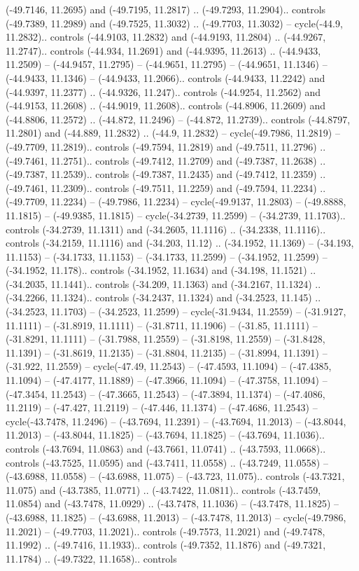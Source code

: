 \begin{scope}[shift={(2.5552, 9.9912)}]
\begin{scope}[shift={(48.1654, -14.8546)}]
(-49.7146, 11.2695) and (-49.7195, 11.2817) .. (-49.7293, 11.2904).. controls (-49.7389, 11.2989) and (-49.7525, 11.3032) .. (-49.7703, 11.3032) -- cycle(-44.9, 11.2832).. controls (-44.9103, 11.2832) and (-44.9193, 11.2804) .. (-44.9267, 11.2747).. controls (-44.934, 11.2691) and (-44.9395, 11.2613) .. (-44.9433, 11.2509) -- (-44.9457, 11.2795) -- (-44.9651, 11.2795) -- (-44.9651, 11.1346) -- (-44.9433, 11.1346) -- (-44.9433, 11.2066).. controls (-44.9433, 11.2242) and (-44.9397, 11.2377) .. (-44.9326, 11.247).. controls (-44.9254, 11.2562) and (-44.9153, 11.2608) .. (-44.9019, 11.2608).. controls (-44.8906, 11.2609) and (-44.8806, 11.2572) .. (-44.872, 11.2496) -- (-44.872, 11.2739).. controls (-44.8797, 11.2801) and (-44.889, 11.2832) .. (-44.9, 11.2832) -- cycle(-49.7986, 11.2819) -- (-49.7709, 11.2819).. controls (-49.7594, 11.2819) and (-49.7511, 11.2796) .. (-49.7461, 11.2751).. controls (-49.7412, 11.2709) and (-49.7387, 11.2638) .. (-49.7387, 11.2539).. controls (-49.7387, 11.2435) and (-49.7412, 11.2359) .. (-49.7461, 11.2309).. controls (-49.7511, 11.2259) and (-49.7594, 11.2234) .. (-49.7709, 11.2234) -- (-49.7986, 11.2234) -- cycle(-49.9137, 11.2803) -- (-49.8888, 11.1815) -- (-49.9385, 11.1815) -- cycle(-34.2739, 11.2599) -- (-34.2739, 11.1703).. controls (-34.2739, 11.1311) and (-34.2605, 11.1116) .. (-34.2338, 11.1116).. controls (-34.2159, 11.1116) and (-34.203, 11.12) .. (-34.1952, 11.1369) -- (-34.193, 11.1153) -- (-34.1733, 11.1153) -- (-34.1733, 11.2599) -- (-34.1952, 11.2599) -- (-34.1952, 11.178).. controls (-34.1952, 11.1634) and (-34.198, 11.1521) .. (-34.2035, 11.1441).. controls (-34.209, 11.1363) and (-34.2167, 11.1324) .. (-34.2266, 11.1324).. controls (-34.2437, 11.1324) and (-34.2523, 11.145) .. (-34.2523, 11.1703) -- (-34.2523, 11.2599) -- cycle(-31.9434, 11.2559) -- (-31.9127, 11.1111) -- (-31.8919, 11.1111) -- (-31.8711, 11.1906) -- (-31.85, 11.1111) -- (-31.8291, 11.1111) -- (-31.7988, 11.2559) -- (-31.8198, 11.2559) -- (-31.8428, 11.1391) -- (-31.8619, 11.2135) -- (-31.8804, 11.2135) -- (-31.8994, 11.1391) -- (-31.922, 11.2559) -- cycle(-47.49, 11.2543) -- (-47.4593, 11.1094) -- (-47.4385, 11.1094) -- (-47.4177, 11.1889) -- (-47.3966, 11.1094) -- (-47.3758, 11.1094) -- (-47.3454, 11.2543) -- (-47.3665, 11.2543) -- (-47.3894, 11.1374) -- (-47.4086, 11.2119) -- (-47.427, 11.2119) -- (-47.446, 11.1374) -- (-47.4686, 11.2543) -- cycle(-43.7478, 11.2496) -- (-43.7694, 11.2391) -- (-43.7694, 11.2013) -- (-43.8044, 11.2013) -- (-43.8044, 11.1825) -- (-43.7694, 11.1825) -- (-43.7694, 11.1036).. controls (-43.7694, 11.0863) and (-43.7661, 11.0741) .. (-43.7593, 11.0668).. controls (-43.7525, 11.0595) and (-43.7411, 11.0558) .. (-43.7249, 11.0558) -- (-43.6988, 11.0558) -- (-43.6988, 11.075) -- (-43.723, 11.075).. controls (-43.7321, 11.075) and (-43.7385, 11.0771) .. (-43.7422, 11.0811).. controls (-43.7459, 11.0854) and (-43.7478, 11.0929) .. (-43.7478, 11.1036) -- (-43.7478, 11.1825) -- (-43.6988, 11.1825) -- (-43.6988, 11.2013) -- (-43.7478, 11.2013) -- cycle(-49.7986, 11.2021) -- (-49.7703, 11.2021).. controls (-49.7573, 11.2021) and (-49.7478, 11.1992) .. (-49.7416, 11.1933).. controls (-49.7352, 11.1876) and (-49.7321, 11.1784) .. (-49.7322, 11.1658).. controls 
\end{scope}
\end{scope}
